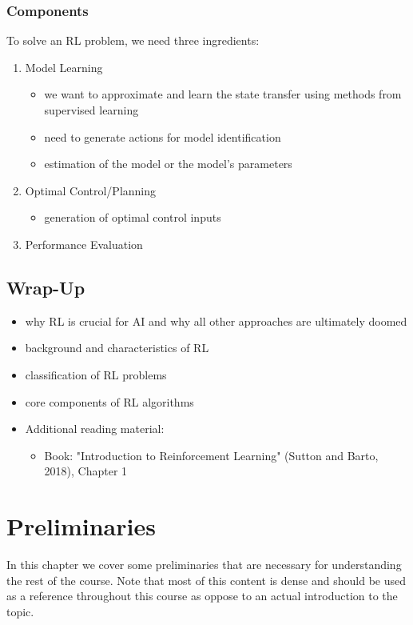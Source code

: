 		\subsection{Components}
			To solve an \ac{RL} problem, we need three ingredients:
			\begin{enumerate}
				\item Model Learning
					\begin{itemize}
						\item we want to approximate and learn the state transfer using methods from supervised learning
						\item need to generate actions for model identification
						\item estimation of the model or the model's parameters
					\end{itemize}
				\item Optimal Control/Planning
					\begin{itemize}
						\item generation of optimal control inputs
					\end{itemize}
				\item Performance Evaluation
			\end{enumerate}

	\section{Wrap-Up}
		\begin{itemize}
			\item why \ac{RL} is crucial for \ac{AI} and why all other approaches are ultimately doomed
			\item background and characteristics of \ac{RL}
			\item classification of \ac{RL} problems
			\item core components of \ac{RL} algorithms
			\item Additional reading material:
				\begin{itemize}
					\item Book: "Introduction to Reinforcement Learning" (Sutton and Barto, 2018), Chapter 1
				\end{itemize}
		\end{itemize}

\chapter{Preliminaries}
	In this chapter we cover some preliminaries that are necessary for understanding the rest of the course. Note that most of this content is dense and should be used as a reference throughout this course as oppose to an actual introduction to the topic.

